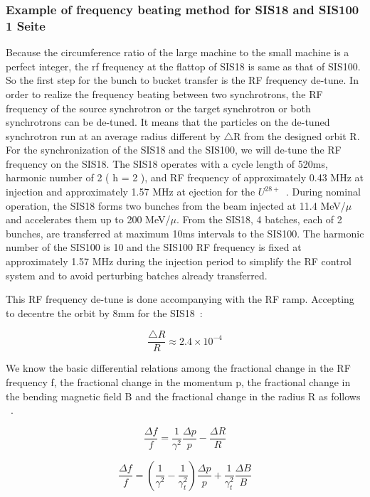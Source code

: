 \subsubsection{Example of frequency beating method for SIS18 and SIS100 1 Seite}
Because the circumference ratio of the large machine to the small machine is a perfect integer, the rf frequency at the flattop of SIS18 is same as that of SIS100. So the first step for the bunch to bucket transfer is the RF frequency de-tune. In order to realize the frequency beating between two synchrotrons, the RF frequency of the source synchrotron or the target synchrotron or both synchrotrons can be de-tuned. It means that the particles on the de-tuned synchrotron run at an average radius different by $\bigtriangleup$R from the designed orbit R. For the synchronization of the SIS18 and the SIS100, we will de-tune the RF frequency on the SIS18. The SIS18 operates with a cycle length of 520ms, harmonic number of 2 ( h = 2 ), and RF frequency of approximately 0.43 MHz at injection and approximately 1.57 MHz at ejection for the $U^{28+}$~\cite{SIS18}. During nominal operation, the SIS18 forms two bunches from the beam injected at 11.4 MeV/$\mu$ and accelerates them up to 200 MeV/$\mu$. From the SIS18, 4 batches, each of 2 bunches, are transferred at  maximum 10ms intervals to the SIS100. The harmonic number of the SIS100 is 10 and the SIS100 RF frequency is fixed at approximately 1.57 MHz during the
injection period to simplify the RF control system and to avoid perturbing batches already transferred.

  This RF frequency de-tune is done accompanying with the RF ramp. Accepting to decentre the orbit by 8mm for the SIS18~\cite{SIS18_man}: 

\begin{equation}
\frac{\bigtriangleup{R}}{R}\approx{2.4}{\times}10^{-4}\label{eq1}
\end{equation}

  We know the basic differential relations among the fractional change in the RF frequency f, the fractional change in the momentum p, the fractional change in the bending magnetic field B and the fractional change in the radius R as follows ~\cite{J-PARC}.


\begin{equation}
\label{eq:eq2}
\frac{\Delta{f}}{f} ={\frac{1}{\gamma^2}}{\frac{\Delta{p}}{p}} - \frac{\Delta{R}}{R}
\end{equation}

\begin{equation}
\frac{\Delta{f}}{f} = (\frac{1}{\gamma^2}-\frac{1}{\gamma_t^2})\frac{\Delta{p}}{p}+{\frac{1}{\gamma_t^2}}{\frac{\Delta{B}}{B}}
\label{eq:eq3}
\end{equation}


